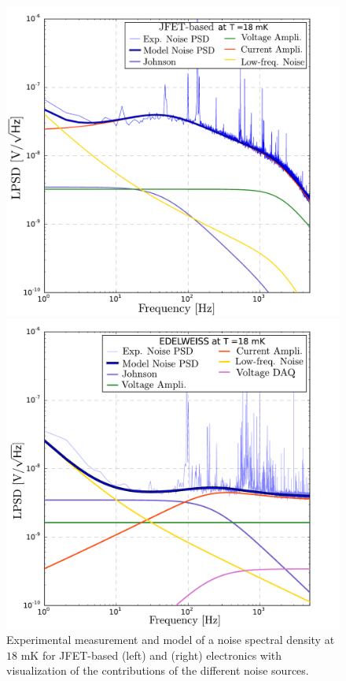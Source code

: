 \begin{figure}
\begin{minipage}{0.49\textwidth}
\includegraphics[width=\textwidth]{Figures/Ethem/cuore_18.pdf}
\end{minipage}
\hfill
\begin{minipage}{0.49\textwidth}
\includegraphics[width=\textwidth]{Figures/Ethem/edel_18.pdf}
\end{minipage}
\caption{Experimental measurement and model of a noise spectral density at $18$ mK for JFET-based (left) and \Edelweiss{} (right) electronics with visualization of the contributions of the different noise sources.}
\label{fig:noise-sources}
\end{figure}

